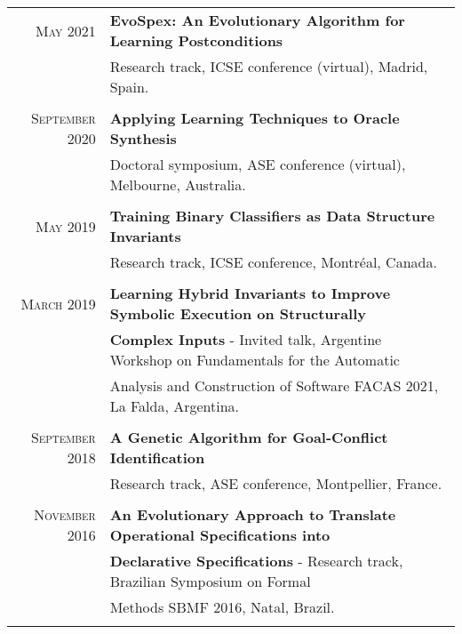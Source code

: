 \documentclass[a4paper,10pt]{article} %
\begin{document}
\begin{longtable}{rl}
\textsc{May} 2021 & \textbf{EvoSpex: An Evolutionary Algorithm for Learning Postconditions} \\ 
& Research track, ICSE conference (virtual), Madrid, Spain. \\ & \\

\textsc{September} 2020 & \textbf{Applying Learning Techniques to Oracle Synthesis} \\ 
& Doctoral symposium, ASE conference (virtual), Melbourne, Australia. \\ & \\

\textsc{May} 2019 & \textbf{Training Binary Classifiers as Data Structure Invariants} \\ 
& Research track, ICSE conference, Montréal, Canada. \\ & \\

\textsc{March} 2019 & \textbf{Learning Hybrid Invariants to Improve Symbolic Execution on Structurally} \\ 
& \textbf{Complex Inputs} - Invited talk, Argentine Workshop on Fundamentals for the Automatic \\ 
& Analysis and Construction of Software FACAS 2021, La Falda, Argentina. \\ & \\

\textsc{September} 2018 & \textbf{A Genetic Algorithm for Goal-Conflict Identification} \\ 
& Research track, ASE conference, Montpellier, France. \\ & \\

\textsc{November} 2016 & \textbf{An Evolutionary Approach to Translate Operational Specifications into} \\
& \textbf{Declarative Specifications} - Research track, Brazilian Symposium on Formal \\ 
& Methods SBMF 2016, Natal, Brazil. \\ & \\

\end{longtable}
\end{document}
